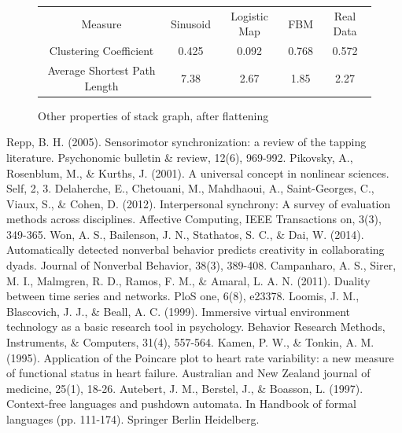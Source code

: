 \documentclass[12pt]{article}
\begin{document}
\begin{figure}\label{fig:stack_ts_others}
  \begin{tabular} {c || c c c c}
    Measure & Sinusoid & Logistic Map & FBM & Real Data \\
    Clustering Coefficient & 0.425 & 0.092 & 0.768 & 0.572 \\
    Average Shortest Path Length & 7.38 & 2.67 & 1.85 & 2.27 \\
  \end{tabular}
  \caption{Other properties of stack graph, after flattening}
\end{figure}


\begin{thebibliography}{}
    Repp, B. H. (2005). Sensorimotor synchronization: a review of the tapping literature. Psychonomic bulletin \& review, 12(6), 969-992.
    Pikovsky, A., Rosenblum, M., \& Kurths, J. (2001). A universal concept in nonlinear sciences. Self, 2, 3.
    Delaherche, E., Chetouani, M., Mahdhaoui, A., Saint-Georges, C., Viaux, S., \& Cohen, D. (2012). Interpersonal synchrony: A survey of evaluation methods across disciplines. Affective Computing, IEEE Transactions on, 3(3), 349-365.
    Won, A. S., Bailenson, J. N., Stathatos, S. C., \& Dai, W. (2014). Automatically detected nonverbal behavior predicts creativity in collaborating dyads. Journal of Nonverbal Behavior, 38(3), 389-408.
    Campanharo, A. S., Sirer, M. I., Malmgren, R. D., Ramos, F. M., \& Amaral, L. A. N. (2011). Duality between time series and networks. PloS one, 6(8), e23378.
    Loomis, J. M., Blascovich, J. J., \& Beall, A. C. (1999). Immersive virtual environment technology as a basic research tool in psychology. Behavior Research Methods, Instruments, \& Computers, 31(4), 557-564.
    Kamen, P. W., \& Tonkin, A. M. (1995). Application of the Poincare plot to heart rate variability: a new measure of functional status in heart failure. Australian and New Zealand journal of medicine, 25(1), 18-26.
    Autebert, J. M., Berstel, J., \& Boasson, L. (1997). Context-free languages and pushdown automata. In Handbook of formal languages (pp. 111-174). Springer Berlin Heidelberg.

\end{thebibliography}
\end{document}
